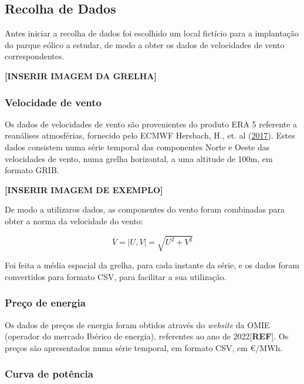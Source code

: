 \documentclass[
  letterpaper,
  DIV=11,
  numbers=noendperiod]{scrartcl}
\begin{document}
\hypertarget{recolha-de-dados}{%
\subsection{Recolha de Dados}\label{recolha-de-dados}}

Antes iniciar a recolha de dados foi escolhido um local fictício para a
implantação do parque eólico a estudar, de modo a obter os dados de
velocidades de vento correspondentes.

\textbf{{[}INSERIR IMAGEM DA GRELHA{]}}

\hypertarget{velocidade-de-vento}{%
\subsubsection{Velocidade de vento}\label{velocidade-de-vento}}

Os dados de velocidades de vento são provenientes do produto ERA 5
referente a reanálises atmosférias, fornecido pelo ECMWF Hersbach, H.,
et. al (\protect\hyperlink{ref-era5}{2017}). Estes dados consistem numa
série temporal das componentes Norte e Oeste das velocidades de vento,
numa grelha horizontal, a uma altitude de 100m, em formato GRIB.

\textbf{{[}INSERIR IMAGEM DE EXEMPLO{]}}

De modo a utilizaros dados, as componentes do vento foram combinadas
para obter a norma da velocidade do vento:

\[
\overline V = |U,V| = \sqrt{U^2 + V^2}
\]

Foi feita a média espacial da grelha, para cada instante da série, e os
dados foram convertidos para formato CSV, para facilitar a sua
utilização.

\hypertarget{preuxe7o-de-energia}{%
\subsubsection{Preço de energia}\label{preuxe7o-de-energia}}

Os dados de preços de energia foram obtidos através do \emph{website} da
OMIE (operador do mercado Ibérico de energia), referentes ao ano de
2022{[}\textbf{REF}{]}. Os preços são apresentados numa série temporal,
em formato CSV, em €/MWh.

\hypertarget{curva-de-potuxeancia}{%
\subsubsection{Curva de potência}\label{curva-de-potuxeancia}}
\end{document}
